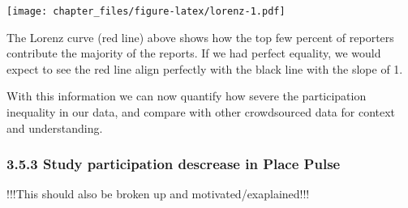 \documentclass[
]{article}
\newenvironment{Shaded}{\begin{snugshade}}{\end{snugshade}}
\newcommand{\DataTypeTok}[1]{\textcolor[rgb]{0.13,0.29,0.53}{#1}}
\newcommand{\DecValTok}[1]{\textcolor[rgb]{0.00,0.00,0.81}{#1}}
\newcommand{\KeywordTok}[1]{\textcolor[rgb]{0.13,0.29,0.53}{\textbf{#1}}}
\newcommand{\NormalTok}[1]{#1}
\newcommand{\OperatorTok}[1]{\textcolor[rgb]{0.81,0.36,0.00}{\textbf{#1}}}
\newcommand{\StringTok}[1]{\textcolor[rgb]{0.31,0.60,0.02}{#1}}
\begin{document}
\begin{Shaded}
\end{Shaded}

\texttt{[image: chapter\_files/figure-latex/lorenz-1.pdf]}

The Lorenz curve (red line) above shows how the top few percent of
reporters contribute the majority of the reports. If we had perfect
equality, we would expect to see the red line align perfectly with the
black line with the slope of 1.

With this information we can now quantify how severe the participation
inequality in our data, and compare with other crowdsourced data for
context and understanding.

\hypertarget{study-participation-descrease-in-place-pulse}{%
\subsubsection{3.5.3 Study participation descrease in Place
Pulse}\label{study-participation-descrease-in-place-pulse}}

!!!This should also be broken up and motivated/exaplained!!!
\end{document}
